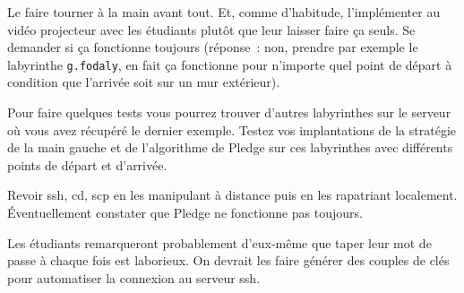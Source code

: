 \documentclass[a4paper]{article}
\newenvironment{enseignants}[1]{\noindent\color{blue}{\bf #1}}{}
\begin{document}


\begin{enseignants}{Sur l'algorithme de Pledge~:}
  Le faire tourner à la main avant tout.
  Et, comme d'habitude, l'implémenter au vidéo projecteur avec les étudiants plutôt que leur laisser faire ça seuls.
  Se demander si ça fonctionne toujours (réponse~: non, prendre par exemple le labyrinthe \verb|g.fodaly|, en fait ça fonctionne pour n'importe quel point de départ à condition que l'arrivée soit sur un mur extérieur).
\end{enseignants}

Pour faire quelques tests vous pourrez trouver d'autres labyrinthes sur le serveur où vous avez récupéré le dernier exemple.
Testez vos implantations de la stratégie de la main gauche et de l'algorithme de Pledge sur ces labyrinthes avec différents points de départ et d'arrivée.

\begin{enseignants}{But de ces nouveaux labyrinthes~:}
  Revoir ssh, cd, scp en les manipulant à distance puis en les rapatriant localement.
  Éventuellement constater que Pledge ne fonctionne pas toujours.

    Les étudiants remarqueront probablement d'eux-même que taper leur mot de passe à chaque fois est laborieux. On devrait les faire générer des couples de clés pour automatiser la connexion au serveur ssh.
\end{enseignants}

\end{document}
